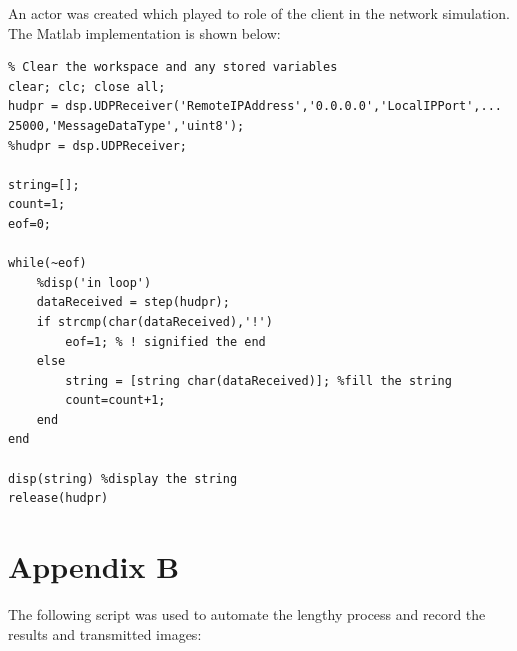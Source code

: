 \documentclass{article}
\begin{document}
An actor was created which played to role of the client in the network simulation. The Matlab implementation is shown below:

\begin{lstlisting}
% Clear the workspace and any stored variables
clear; clc; close all;
hudpr = dsp.UDPReceiver('RemoteIPAddress','0.0.0.0','LocalIPPort',...
25000,'MessageDataType','uint8');
%hudpr = dsp.UDPReceiver;

string=[];
count=1;
eof=0;

while(~eof)
	%disp('in loop')
	dataReceived = step(hudpr);
	if strcmp(char(dataReceived),'!')
		eof=1; % ! signified the end
	else
		string = [string char(dataReceived)]; %fill the string
		count=count+1;
	end
end

disp(string) %display the string
release(hudpr)
\end{lstlisting}

\newpage


\section{Appendix B}

The following script was used to automate the lengthy process and record the results and transmitted images:
\end{document}
